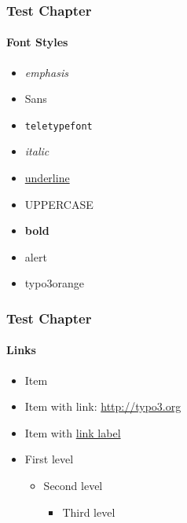\begin{frame}
	\frametitle{Test Chapter}
	\framesubtitle{Font Styles}

	\begin{itemize}
		\item \emph{emphasis}
		\item \textsf{Sans}
		\item \texttt{teletypefont}
		\item \textit{italic}
		\item \underline{underline}
		\item \uppercase{uppercase}
		\item \textbf{bold}
		\item \alert{alert}
		\item
			\begingroup
				\color{typo3orange}
				typo3orange
			\endgroup

	\end{itemize}

\end{frame}


\begin{frame}
	\frametitle{Test Chapter}
	\framesubtitle{Links}

	\begin{itemize}
		\item Item
		\item Item with link: \url{http://typo3.org}
		\item Item with \href{http://typo3.org}{link label}

		\item First level
		\begin{itemize}
			\item Second level
			\begin{itemize}
				\item Third level
			\end{itemize}
		\end{itemize}

	\end{itemize}

\end{frame}


